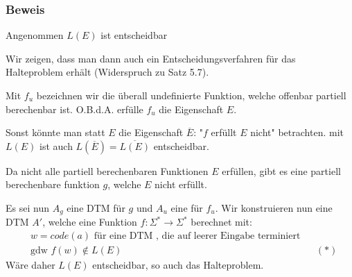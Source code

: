 \subsubsection{Beweis}
Angenommen $L(E)$ ist entscheidbar\par
Wir zeigen, dass man dann auch ein Entscheidungsverfahren für das Halteproblem erhält (Widerspruch zu Satz 5.7).\par 
Mit $f_u$ bezeichnen wir die überall undefinierte Funktion, welche offenbar partiell berechenbar ist. O.B.d.A. erfülle $f_u$ die Eigenschaft $E$. \par 
Sonst könnte man statt $E$ die Eigenschaft $\overline{E}$: "$f$ erfüllt $E$ nicht" betrachten. mit $L(E)$ ist auch $L(\overline{E})= \overline{L(E)}$ entscheidbar. \par 
Da nicht alle partiell berechenbaren Funktionen $E$ erfüllen, gibt es eine partiell berechenbare funktion $g$, welche $E$ nicht erfüllt.\par 
Es sei nun $A_g$ eine DTM für $g$ und $A_u$ eine für $f_u$. Wir konstruieren nun eine DTM $A'$, welche eine Funktion $f:\Sigma^* \to \Sigma^*$ berechnet mit:
\begin{align*}
	&w = code(a) \text{ für eine DTM , die auf leerer Eingabe terminiert}\\
	&\text{gdw } f(w) \notin L(E) &&(*)
\end{align*}
Wäre daher $L(E)$ entscheidbar, so auch das Halteproblem.
\\

